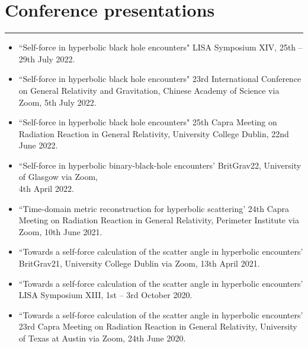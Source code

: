 \documentclass[10.5pt, oneside]{article}   	%
\begin{document}
 {\color{Sectioncolour}
\section*{Conference presentations}
\vspace{-3mm}
\noindent\rule{\linewidth}{0.6pt}}
\begin{itemize}
\item``Self-force in hyperbolic black hole encounters" LISA Symposium XIV, 25th -- 29th July 2022. \href{https://www.youtube.com/watch?v=p2-RgYB6Jhk}{}
\item ``Self-force in hyperbolic black hole encounters" 23rd International Conference on General Relativity and Gravitation, Chinese Academy of Science via Zoom, 5th July 2022. \href{https://www.koushare.com/video/videodetail/30159}{}
\item ``Self-force in hyperbolic black hole encounters" 25th Capra Meeting on Radiation Reaction in General Relativity, University College Dublin, 22nd June 2022. \href{https://oliverlong.info/talks/capra25}{}
\item ``Self-force in hyperbolic binary-black-hole encounters' BritGrav22, University of Glasgow via Zoom, \\ 4th April 2022. \href{https://www.youtube.com/watch?v=zZEblkjb5IM}{}
\item ``Time-domain metric reconstruction for hyperbolic scattering' 24th Capra Meeting on Radiation Reaction in General Relativity, Perimeter Institute via Zoom, 10th June 2021. \href{https://pirsa.org/21060058}{}
\item ``Towards a self-force calculation of the scatter angle in hyperbolic encounters' BritGrav21, University College Dublin via Zoom, 13th April 2021. \href{https://oliverlong.info/talks/britgrav21}{}
\item``Towards a self-force calculation of the scatter angle in hyperbolic encounters' LISA Symposium XIII, 1st -- 3rd October 2020. \href{https://lisasymposium13.lisamission.org/presentations/i0xMnRFWi7WKbO5f01caGDH0zPK2/7qz7uYC3qHuzj9AsC49h}{}
\item ``Towards a self-force calculation of the scatter angle in hyperbolic encounters' 23rd Capra Meeting on Radiation Reaction in General Relativity, University of Texas at Austin via Zoom, 24th June 2020. \href{https://www.youtube.com/watch?v=HB-Rw5kRUfg&t=11311s}{}
\end{itemize} 
 
\end{document}
